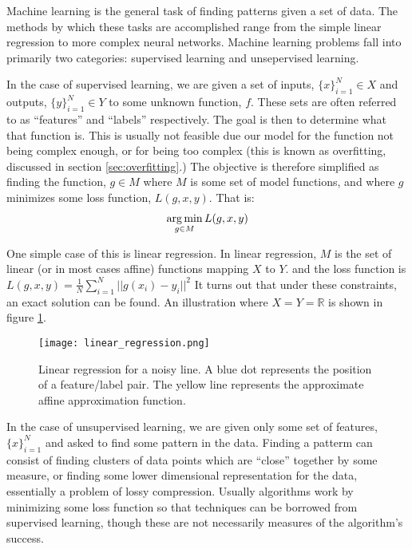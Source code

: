 Machine learning is the general task of finding patterns given a set of data.  The methods by which these tasks are accomplished range from the simple linear regression to more complex neural networks.  Machine learning problems fall into primarily two categories: supervised learning and unsepervised learning.  

In the case of supervised learning, we are given a set of inputs, $\{x\}_{i=1}^N\in X$ and outputs, $\{y\}_{i=1}^N\in Y$ to some unknown function, $f$.  These sets are often referred to as ``features'' and ``labels'' respectively.  The goal is then to determine what that function is.  This is usually not feasible due our model for the function not being complex enough, or for being too complex (this is known as overfitting, discussed in section \ref{sec:overfitting}.)  The objective is therefore simplified as finding the function, $g \in M$ where $M$ is some set of model functions, and where $g$ minimizes some loss function, $L(g,x,y)$.  That is:
\begin{align}
\operatorname*{arg\,min}_{g \in M} L(g,x,y)
\end{align}

One simple case of this is linear regression.  In linear regression, $M$ is the set of linear (or in most cases affine) functions mapping $X$ to $Y$. and the loss function is $L(g,x,y) = \frac{1}{N} \sum_{i=1}^N ||g(x_i)-y_i||^2$  It turns out that under these constraints, an exact solution can be found.  An illustration where $X=Y= \mathbb{R}$ is shown in figure \ref{fig:linear_regression}.

\begin{figure}
    \centering
    \texttt{[image: linear\_regression.png]}
    \caption{Linear regression for a noisy line.  A blue dot represents the position of a feature/label pair.  The yellow line represents the approximate affine approximation function.}
    \label{fig:linear_regression}
\end{figure}

In the case of unsupervised learning, we are given only some set of features, $\{x\}_{i=1}^N$ and asked to find some pattern in the data.  Finding a patterm can consist of finding clusters of data points which are ``close'' together by some measure, or finding some lower dimensional representation for the data, essentially a problem of lossy compression.  Usually algorithms work by minimizing some loss function so that techniques can be borrowed from supervised learning, though these are not necessarily measures of the algorithm's success.  

